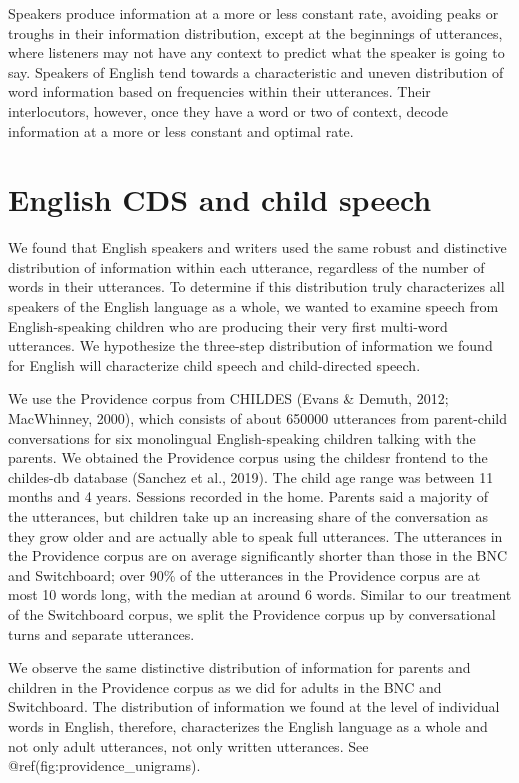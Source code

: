 \documentclass[man,floatsintext]{apa6}
\begin{document}
Speakers produce information at a more or less constant rate, avoiding peaks or troughs in their information distribution, except at the beginnings of utterances, where listeners may not have any context to predict what the speaker is going to say. Speakers of English tend towards a characteristic and uneven distribution of word information based on frequencies within their utterances. Their interlocutors, however, once they have a word or two of context, decode information at a more or less constant and optimal rate.

\hypertarget{english-cds-and-child-speech}{%
\section{English CDS and child speech}\label{english-cds-and-child-speech}}

We found that English speakers and writers used the same robust and distinctive distribution of information within each utterance, regardless of the number of words in their utterances. To determine if this distribution truly characterizes all speakers of the English language as a whole, we wanted to examine speech from English-speaking children who are producing their very first multi-word utterances. We hypothesize the three-step distribution of information we found for English will characterize child speech and child-directed speech.

We use the Providence corpus from CHILDES (Evans \& Demuth, 2012; MacWhinney, 2000), which consists of about 650000 utterances from parent-child conversations for six monolingual English-speaking children talking with the parents. We obtained the Providence corpus using the childesr frontend to the childes-db database (Sanchez et al., 2019). The child age range was between 11 months and 4 years. Sessions recorded in the home. Parents said a majority of the utterances, but children take up an increasing share of the conversation as they grow older and are actually able to speak full utterances. The utterances in the Providence corpus are on average significantly shorter than those in the BNC and Switchboard; over 90\% of the utterances in the Providence corpus are at most 10 words long, with the median at around 6 words. Similar to our treatment of the Switchboard corpus, we split the Providence corpus up by conversational turns and separate utterances.

We observe the same distinctive distribution of information for parents and children in the Providence corpus as we did for adults in the BNC and Switchboard. The distribution of information we found at the level of individual words in English, therefore, characterizes the English language as a whole and not only adult utterances, not only written utterances. See @ref(fig:providence\_unigrams).
\end{document}
